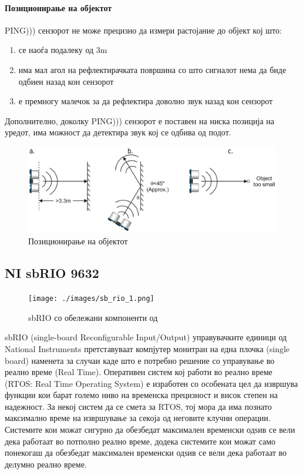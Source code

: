 \documentclass[12pt]{article}
\begin{document}
      \paragraph{Позиционирање на објектот\\}
        PING))) сензорот не може прецизно да измери растојание до објект кој што:

      \renewcommand{\theenumi}{\alph{enumi}}
      \begin{enumerate}
        \item се наоѓа подалеку од 3m
        \item има мал агол на рефлектирачката површина со што сигналот нема да биде одбиен назад кон сензорот
        \item е премногу малечок за да рефлектира доволно звук назад кон сензорот
        \end{enumerate}

		  Дополнително, доколку PING))) сензорот е поставен на ниска позиција на уредот, има можност да детектира звук кој се одбива од подот.

      \begin{figure}[H]
        \includegraphics[width=0.75\linewidth]{./images/ping_obj.png}
        \centering
        \caption{Позиционирање на објектот}
        \label{fig:ping_obj.png}
        \end{figure}

  \subsection{NI sbRIO 9632}
	  \begin{figure}[h]
		  \centering
		  \texttt{[image: ./images/sb\_rio\_1.png]}
		  \caption{sbRIO со обележани компоненти од \cite{experiments}}
		  \label{fig:sb_rio_1.png}
		  \end{figure}

    sbRIO (single-board Reconfigurable Input/Output) управувачките единици од National Instruments претставуваат компјутер монитран на една плочка (single board) наменета за случаи каде што е потребно решение со управување во реално време (Real Time). Оперативен систем кој работи во реално време (RTOS: Real Time Operating System) е изработен со особената цел да извршува функции кои барат големо ниво на временска прецизност и висок степен на надежност. За некој систем да се смета за RTOS, тој мора да има познато максимално време на извршување за секоја од неговите клучни операции. Системите кои можат сигурно да обезбедат максимален временски одѕив се вели дека работаат во потполно реално време, додека системите кои можат само понекогаш да обезбедат максимален временски одѕив се вели дека работаат во делумно реално време.
\end{document}
